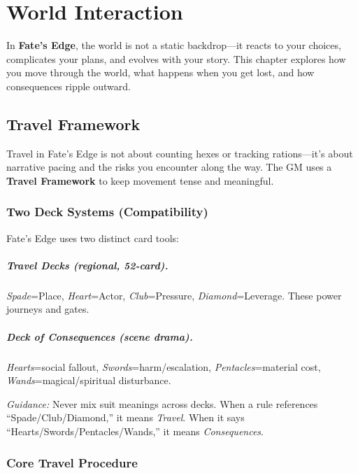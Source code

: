 
\chapter{World Interaction}

In \textbf{Fate's Edge}, the world is not a static backdrop—it reacts to your choices, complicates your plans, and evolves with your story. This chapter explores how you move through the world, what happens when you get lost, and how consequences ripple outward.

\section{Travel Framework}

Travel in Fate's Edge is not about counting hexes or tracking rations—it's about narrative pacing and the risks you encounter along the way. The GM uses a \textbf{Travel Framework} to keep movement tense and meaningful.

\subsection*{Two Deck Systems (Compatibility)}

Fate's Edge uses two distinct card tools:

\paragraph{Travel Decks (regional, 52-card).}
\emph{Spade}=Place, \emph{Heart}=Actor, \emph{Club}=Pressure, \emph{Diamond}=Leverage. These power journeys and gates.

\paragraph{Deck of Consequences (scene drama).}
\emph{Hearts}=social fallout, \emph{Swords}=harm/escalation, \emph{Pentacles}=material cost, \emph{Wands}=magical/spiritual disturbance.

\textit{Guidance:} Never mix suit meanings across decks. When a rule references ``Spade/Club/Diamond,'' it means \emph{Travel}. When it says ``Hearts/Swords/Pentacles/Wands,'' it means \emph{Consequences}.

\subsection*{Core Travel Procedure}

